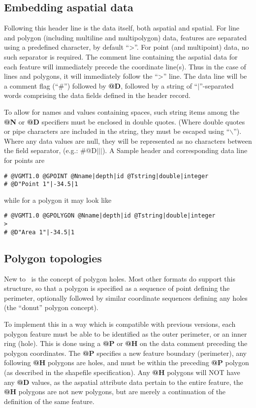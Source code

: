 \subsection{Embedding aspatial data}

Following this header line is the data itself, both aspatial and
spatial. For line and polygon (including multiline and multipolygon)
data, features are separated using a predefined character, by default
``{\textgreater}''. For point (and
multipoint) data, no such separator is required. The comment line
containing the aspatial data for each feature will immediately precede
the coordinate line(s). Thus in the case of lines and polygons, it will
immediately follow the ``{\textgreater}'' line. The data
line will be a comment flag (``\#'') followed by \textbf{@D}, followed by a string of
``$|$''-separated words comprising the data fields defined in the header record. 

To allow for names and values containing spaces, such string items among
the \textbf{@N} or \textbf{@D} specifiers must be enclosed in double quotes.
(Where double quotes or pipe characters are included in the string,
they must be escaped using ``$\backslash$''). Where any
data values are null, they will be represented as no characters between
the field separator, (e.g.: \#@D$|$$|$$|$).  A Sample header and corresponding
data line for points are

\begin{verbatim}
# @VGMT1.0 @GPOINT @Nname|depth|id @Tstring|double|integer
# @D"Point 1"|-34.5|1
\end{verbatim}
\noindent
while for a polygon it may look like
\begin{verbatim}
# @VGMT1.0 @GPOLYGON @Nname|depth|id @Tstring|double|integer
>
# @D"Area 1"|-34.5|1
\end{verbatim}

\subsection{Polygon topologies}

New to \GMT\ is the concept of polygon holes.
Most other formats do support this structure, so that a polygon is
specified as a sequence of point defining the perimeter, optionally
followed by similar coordinate sequences defining any holes (the
``donut'' polygon concept). 

To implement this in a way which is compatible with previous \GMT versions,
each polygon feature must be able to be identified as the
outer perimeter, or an inner ring (hole). This is done using a \textbf{@P} or \textbf{@H}
on the data comment preceding the polygon coordinates. The \textbf{@P} specifies
a new feature boundary (perimeter), any following \textbf{@H} polygons are
holes, and must be within the preceding \textbf{@P} polygon (as described in the
shapefile specification). Any \textbf{@H} polygons will NOT have any \textbf{@D} values,
as the aspatial attribute data pertain to the entire feature, the \textbf{@H}
polygons are not new polygons, but are merely a continuation of the
definition of the same feature.

